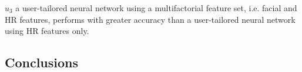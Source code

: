 


$u_3$ a user-tailored neural network using a multifactorial feature set, i.e. facial and HR features, performs with greater accuracy than a user-tailored neural network using HR features only.

\subsection{Conclusions}




